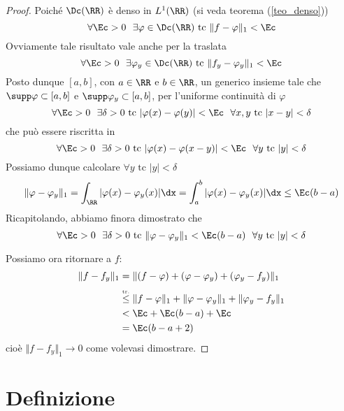 \begin{proof}
Poiché $\Dc(\RR)$ è denso in $L^1(\RR)$ (si veda teorema (\ref{teo_denso}))
\begin{equation*}
\forall\Ec>0\ \ \exists\varphi\in\Dc(\RR)\text{ tc } \Vert f-\varphi\Vert_1<\Ec
\end{equation*}
Ovviamente tale risultato vale anche per la traslata
\begin{equation*}
\forall\Ec>0\ \ \exists\varphi_y\in\Dc(\RR)\text{ tc } \Vert f_y-\varphi_y\Vert_1<\Ec
\end{equation*}
Posto dunque $[a,b]$, con $a\in\RR$ e $b\in\RR$, un generico insieme tale che $\supp\varphi\subset[a,b]$ e $\supp\varphi_y\subset[a,b]$, per l'uniforme continuità di $\varphi$
\begin{equation*}
\forall\Ec>0\ \ \exists\delta>0\text{ tc }|\varphi(x)-\varphi(y)|<\Ec\ \ \forall x,y\text{ tc }|x-y|<\delta
\end{equation*}
che può essere riscritta in
\begin{equation*}
\forall\Ec>0\ \ \exists\delta>0\text{ tc }|\varphi(x)-\varphi(x-y)|<\Ec\ \ \forall y\text{ tc }|y|<\delta
\end{equation*}
Possiamo dunque calcolare $\forall y\text{ tc }|y|<\delta$
\begin{equation*}
\Vert\varphi-\varphi_y\Vert_{1}=\int_\RR |\varphi(x)-\varphi_y(x)|\dx=\int_a^b |\varphi(x)-\varphi_y(x)|\dx\leq \Ec(b-a)
\end{equation*}
Ricapitolando, abbiamo finora dimostrato che
\begin{equation*}
\forall\Ec>0\ \ \exists\delta>0\text{ tc }\Vert\varphi-\varphi_y\Vert_1<\Ec(b-a)\ \ \forall y\text{ tc }|y|<\delta
\end{equation*}

Possiamo ora ritornare a $f$:
\begin{align*}
\Vert f - f_y \Vert_1 & = \Vert (f - \varphi) + (\varphi - \varphi_y) + (\varphi_y - f_y) \Vert_1 \\
  &\overset{\underset{\mathrm{tr.}}{}}{\leq} \Vert f - \varphi \Vert_1 + \Vert \varphi - \varphi_y \Vert_1 + \Vert \varphi_y - f_y \Vert_1 \\
 & < \Ec +\Ec(b-a) + \Ec \\
 & =\Ec(b-a+2)
\end{align*}
cioè $ \Vert f - f_y \Vert_1 \to 0$ come volevasi dimostrare.
\end{proof}


\section{Definizione}

